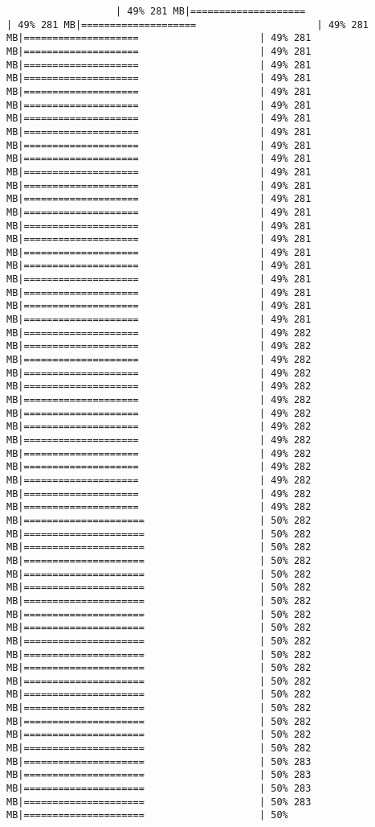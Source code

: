 \documentclass[
]{article}
\begin{document}
\begin{verbatim}
                   | 49% 281 MB|====================                     | 49% 281 MB|====================                     | 49% 281 MB|====================                     | 49% 281 MB|====================                     | 49% 281 MB|====================                     | 49% 281 MB|====================                     | 49% 281 MB|====================                     | 49% 281 MB|====================                     | 49% 281 MB|====================                     | 49% 281 MB|====================                     | 49% 281 MB|====================                     | 49% 281 MB|====================                     | 49% 281 MB|====================                     | 49% 281 MB|====================                     | 49% 281 MB|====================                     | 49% 281 MB|====================                     | 49% 281 MB|====================                     | 49% 281 MB|====================                     | 49% 281 MB|====================                     | 49% 281 MB|====================                     | 49% 281 MB|====================                     | 49% 281 MB|====================                     | 49% 281 MB|====================                     | 49% 281 MB|====================                     | 49% 281 MB|====================                     | 49% 282 MB|====================                     | 49% 282 MB|====================                     | 49% 282 MB|====================                     | 49% 282 MB|====================                     | 49% 282 MB|====================                     | 49% 282 MB|====================                     | 49% 282 MB|====================                     | 49% 282 MB|====================                     | 49% 282 MB|====================                     | 49% 282 MB|====================                     | 49% 282 MB|====================                     | 49% 282 MB|====================                     | 49% 282 MB|====================                     | 49% 282 MB|=====================                    | 50% 282 MB|=====================                    | 50% 282 MB|=====================                    | 50% 282 MB|=====================                    | 50% 282 MB|=====================                    | 50% 282 MB|=====================                    | 50% 282 MB|=====================                    | 50% 282 MB|=====================                    | 50% 282 MB|=====================                    | 50% 282 MB|=====================                    | 50% 282 MB|=====================                    | 50% 282 MB|=====================                    | 50% 282 MB|=====================                    | 50% 282 MB|=====================                    | 50% 282 MB|=====================                    | 50% 282 MB|=====================                    | 50% 282 MB|=====================                    | 50% 282 MB|=====================                    | 50% 282 MB|=====================                    | 50% 283 MB|=====================                    | 50% 283 MB|=====================                    | 50% 283 MB|=====================                    | 50% 283 MB|=====================                    | 50% 
\end{verbatim}
\end{document}
